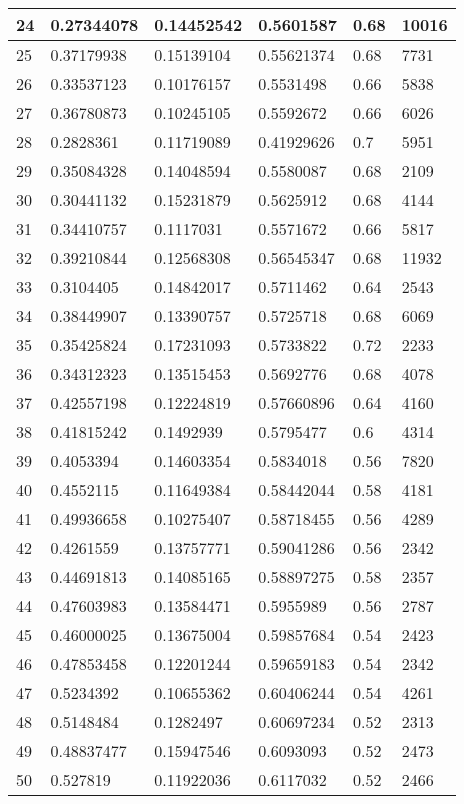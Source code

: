 \begin{longtable}{|l|l|l|l|l|l|}
24 & 0.27344078 & 0.14452542 & 0.5601587 & 0.68 & 10016 \\ \hline 
25 & 0.37179938 & 0.15139104 & 0.55621374 & 0.68 & 7731 \\ \hline 
26 & 0.33537123 & 0.10176157 & 0.5531498 & 0.66 & 5838 \\ \hline 
27 & 0.36780873 & 0.10245105 & 0.5592672 & 0.66 & 6026 \\ \hline 
28 & 0.2828361 & 0.11719089 & 0.41929626 & 0.7 & 5951 \\ \hline 
29 & 0.35084328 & 0.14048594 & 0.5580087 & 0.68 & 2109 \\ \hline 
30 & 0.30441132 & 0.15231879 & 0.5625912 & 0.68 & 4144 \\ \hline 
31 & 0.34410757 & 0.1117031 & 0.5571672 & 0.66 & 5817 \\ \hline 
32 & 0.39210844 & 0.12568308 & 0.56545347 & 0.68 & 11932 \\ \hline 
33 & 0.3104405 & 0.14842017 & 0.5711462 & 0.64 & 2543 \\ \hline 
34 & 0.38449907 & 0.13390757 & 0.5725718 & 0.68 & 6069 \\ \hline 
35 & 0.35425824 & 0.17231093 & 0.5733822 & 0.72 & 2233 \\ \hline 
36 & 0.34312323 & 0.13515453 & 0.5692776 & 0.68 & 4078 \\ \hline 
37 & 0.42557198 & 0.12224819 & 0.57660896 & 0.64 & 4160 \\ \hline 
38 & 0.41815242 & 0.1492939 & 0.5795477 & 0.6 & 4314 \\ \hline 
39 & 0.4053394 & 0.14603354 & 0.5834018 & 0.56 & 7820 \\ \hline 
40 & 0.4552115 & 0.11649384 & 0.58442044 & 0.58 & 4181 \\ \hline 
41 & 0.49936658 & 0.10275407 & 0.58718455 & 0.56 & 4289 \\ \hline 
42 & 0.4261559 & 0.13757771 & 0.59041286 & 0.56 & 2342 \\ \hline 
43 & 0.44691813 & 0.14085165 & 0.58897275 & 0.58 & 2357 \\ \hline 
44 & 0.47603983 & 0.13584471 & 0.5955989 & 0.56 & 2787 \\ \hline 
45 & 0.46000025 & 0.13675004 & 0.59857684 & 0.54 & 2423 \\ \hline 
46 & 0.47853458 & 0.12201244 & 0.59659183 & 0.54 & 2342 \\ \hline 
47 & 0.5234392 & 0.10655362 & 0.60406244 & 0.54 & 4261 \\ \hline 
48 & 0.5148484 & 0.1282497 & 0.60697234 & 0.52 & 2313 \\ \hline 
49 & 0.48837477 & 0.15947546 & 0.6093093 & 0.52 & 2473 \\ \hline 
50 & 0.527819 & 0.11922036 & 0.6117032 & 0.52 & 2466 \\ \hline 
\end{longtable}